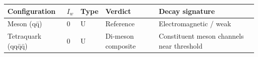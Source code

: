 \documentclass[12pt,a4paper]{article}
\begin{document}
\begin{longtable}[]{@{}lllll@{}}
\toprule
\begin{minipage}[b]{0.17\columnwidth}\raggedright
Configuration\strut
\end{minipage} & \begin{minipage}[b]{0.17\columnwidth}\raggedright
\(I_w\)\strut
\end{minipage} & \begin{minipage}[b]{0.17\columnwidth}\raggedright
Type\strut
\end{minipage} & \begin{minipage}[b]{0.17\columnwidth}\raggedright
Verdict\strut
\end{minipage} & \begin{minipage}[b]{0.17\columnwidth}\raggedright
Decay signature\strut
\end{minipage}\tabularnewline
\midrule
\endhead
\begin{minipage}[t]{0.17\columnwidth}\raggedright
Meson (qq̄)\strut
\end{minipage} & \begin{minipage}[t]{0.17\columnwidth}\raggedright
0\strut
\end{minipage} & \begin{minipage}[t]{0.17\columnwidth}\raggedright
U\strut
\end{minipage} & \begin{minipage}[t]{0.17\columnwidth}\raggedright
Reference\strut
\end{minipage} & \begin{minipage}[t]{0.17\columnwidth}\raggedright
Electromagnetic / weak\strut
\end{minipage}\tabularnewline
\begin{minipage}[t]{0.17\columnwidth}\raggedright
Tetraquark (qqq̄q̄)\strut
\end{minipage} & \begin{minipage}[t]{0.17\columnwidth}\raggedright
0\strut
\end{minipage} & \begin{minipage}[t]{0.17\columnwidth}\raggedright
U\strut
\end{minipage} & \begin{minipage}[t]{0.17\columnwidth}\raggedright
Di-meson composite\strut
\end{minipage} & \begin{minipage}[t]{0.17\columnwidth}\raggedright
Constituent meson channels near threshold\strut
\end{minipage}\tabularnewline

\end{longtable}
\end{document}
